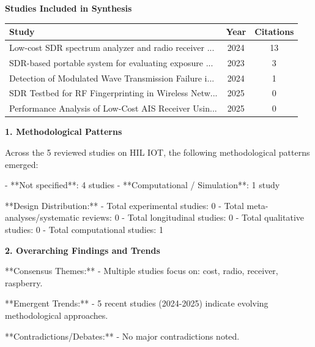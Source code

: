 \documentclass[11pt,a4paper]{article}
\begin{document}
\maketitle



\textbf{\large Studies Included in Synthesis}\par\vspace{0.5em}

\begin{longtable}{p{5cm}cc}
\toprule
\textbf{Study} & \textbf{Year} & \textbf{Citations} \\
\midrule
\endhead
Low-cost SDR spectrum analyzer and radio receiver ... & 2024 & 13 \\
SDR-based portable system for evaluating exposure ... & 2023 & 3 \\
Detection of Modulated Wave Transmission Failure i... & 2024 & 1 \\
SDR Testbed for RF Fingerprinting in Wireless Netw... & 2025 & 0 \\
Performance Analysis of Low-Cost AIS Receiver Usin... & 2025 & 0 \\
\bottomrule
\end{longtable}

\vspace{1em}


\textbf{\large 1. Methodological Patterns}\par\vspace{0.5em}

Across the 5 reviewed studies on HIL IOT, the following methodological patterns emerged:

- **Not specified**: 4 studies
- **Computational / Simulation**: 1 study

**Design Distribution:**
- Total experimental studies: 0
- Total meta-analyses/systematic reviews: 0
- Total longitudinal studies: 0
- Total qualitative studies: 0
- Total computational studies: 1

\vspace{1em}


\textbf{\large 2. Overarching Findings and Trends}\par\vspace{0.5em}

**Consensus Themes:**
- Multiple studies focus on: cost, radio, receiver, raspberry.

**Emergent Trends:**
- 5 recent studies (2024-2025) indicate evolving methodological approaches.

**Contradictions/Debates:**
- No major contradictions noted.
\end{document}
